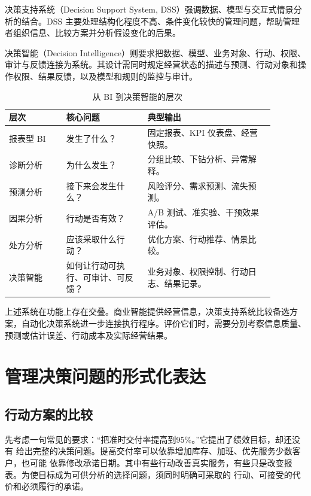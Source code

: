 决策支持系统（Decision Support System, DSS）强调数据、模型与交互式情景分析的结合。DSS 主要处理结构化程度不高、条件变化较快的管理问题，帮助管理者组织信息、比较方案并分析假设变化的后果。

决策智能（Decision Intelligence）则要求把数据、模型、业务对象、行动、权限、审计与反馈连接为系统。其设计需同时规定经营状态的描述与预测、行动对象和操作权限、结果反馈，以及模型和规则的监控与审计。

\begin{table}[htbp]
\centering
\caption{从 BI 到决策智能的层次}
\begin{tabular}{P{0.19\linewidth}P{0.27\linewidth}P{0.42\linewidth}}
\toprule
{}
层次 & 核心问题 & 典型输出\\
\midrule

报表型 BI & 发生了什么？ & 固定报表、KPI 仪表盘、经营快照。\\
诊断分析 & 为什么发生？ & 分组比较、下钻分析、异常解释。\\
预测分析 & 接下来会发生什么？ & 风险评分、需求预测、流失预测。\\
因果分析 & 行动是否有效？ & A/B 测试、准实验、干预效果评估。\\
处方分析 & 应该采取什么行动？ & 优化方案、行动推荐、情景比较。\\
决策智能 & 如何让行动可执行、可审计、可反馈？ & 业务对象、权限控制、行动日志、结果记录。\\
\bottomrule
\end{tabular}
\end{table}

上述系统在功能上存在交叠。商业智能提供经营信息，决策支持系统比较备选方案，自动化决策系统进一步连接执行程序。评价它们时，需要分别考察信息质量、预测或估计误差、行动成本及实际经营结果。

\section{管理决策问题的形式化表达}

\subsection{行动方案的比较}
先考虑一句常见的要求：“把准时交付率提高到95\%。”它提出了绩效目标，却还没有
给出完整的决策问题。提高交付率可以依靠增加库存、加班、优先服务少数客户，也可能
依靠修改承诺日期。其中有些行动改善真实服务，有些只是改变报表。为使目标成为可供分析的选择问题，须同时明确可采取的
行动、可接受的代价和必须履行的承诺。

